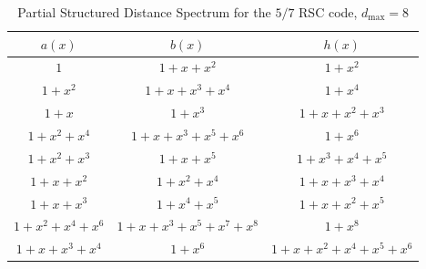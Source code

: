 \begin{table*}[h!]
 \caption{Partial Structured Distance Spectrum for the $5/7$ RSC code, $d_{\text{max}}=8$}
\centering
 \begin{tabular}{c c c} 
 \hline
 $a(x)$ & $b(x)$ & $h(x)$ \\ [0.5ex] 
 \hline\hline
$1$ & $1+x+x^{2}$ & $1+x^2$\\
\hline
$1+x^2$ & $1+x+x^3+x^4$ & $1+x^{4}$\\
\hline
$1+x$ & $1+x^3$ & $1+x+x^2+x^3$\\
\hline
$1+x^2+x^4$ & $1+x+x^3+x^5+x^6$ & $1+x^{6}$\\
\hline
$1+x^2+x^3$ & $1+x+x^5$ & $1+x^3+x^4+x^5$\\
\hline
$1+x+x^2$ & $1+x^2+x^4$ & $1+x+x^3+x^4$\\
\hline
$1+x+x^3$ & $1+x^4+x^5$ & $1+x+x^2+x^5$\\
\hline
$1+x^2+x^4+x^6$ & $1+x+x^3+x^5+x^7+x^8$ & $1+x^8$\\
\hline
$1+x+x^3+x^4$ & $1+x^6$ & $1+x+x^2+x^4+x^5+x^6$\\
 \end{tabular}
 
 \label{novelTab13}
\end{table*}

